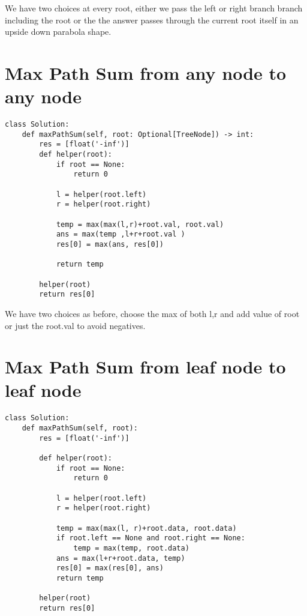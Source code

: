 \documentclass[24pt, a4]{article}
\begin{document}
We have two choices at every root, either we pass the left or right branch branch including the root or the the answer passes through the current root itself in an upside down parabola shape.

\newpage
\section{Max Path Sum from any node to any node}
\begin{lstlisting}
class Solution:
    def maxPathSum(self, root: Optional[TreeNode]) -> int:
        res = [float('-inf')]
        def helper(root):
            if root == None:
                return 0
            
            l = helper(root.left)
            r = helper(root.right)
            
            temp = max(max(l,r)+root.val, root.val)
            ans = max(temp ,l+r+root.val )
            res[0] = max(ans, res[0])
            
            return temp
        
        helper(root)
        return res[0]
\end{lstlisting}

We have two choices as before, choose the max of both l,r and add value of root or just the root.val to avoid negatives.

\section{Max Path Sum from leaf node to leaf node}
\begin{lstlisting}
class Solution:        
    def maxPathSum(self, root):
        res = [float('-inf')]
        
        def helper(root):
            if root == None:
                return 0
                
            l = helper(root.left)
            r = helper(root.right)
            
            temp = max(max(l, r)+root.data, root.data)
            if root.left == None and root.right == None:
                temp = max(temp, root.data)
            ans = max(l+r+root.data, temp)
            res[0] = max(res[0], ans)
            return temp
        
        helper(root)
        return res[0]
\end{lstlisting}
\end{document}
